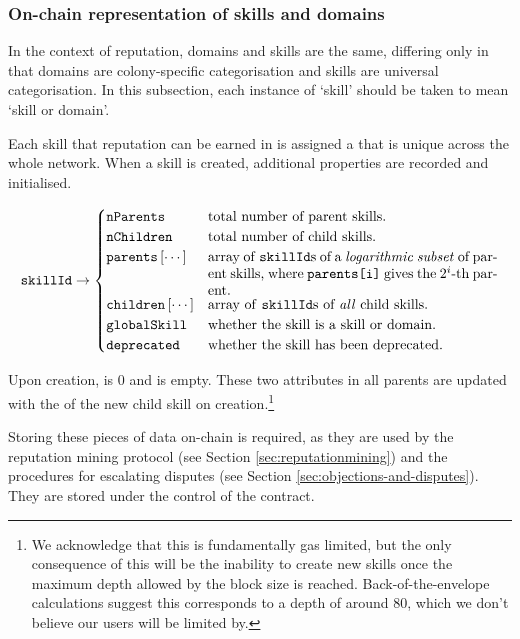 \subsubsection{On-chain representation of skills and domains}\label{subsec:on-chain-representation-of-skills}

In the context of reputation, domains and skills are the same, differing only in that domains are colony-specific categorisation and skills are universal categorisation. In this subsection, each instance of `skill' should be taken to mean `skill or domain'.

Each skill that reputation can be earned in is assigned a  that is unique across the whole network. When a skill is created, additional properties are recorded and initialised.

\begin{equation*}
  \ascode{skillId} \rightarrow
  \begin{cases}
    \ascode{nParents} &	\textnormal{total number of parent skills.}\\
    \ascode{nChildren} &	\textnormal{total number of child skills.}\\
    \ascode{parents}\left[\cdots\right] &	\parbox[t]{.6\linewidth}{\textnormal{array of \ascode{skillId}s of a \textit{logarithmic subset} of parent skills, where \ascode{parents[i]} gives the $2^i$-th parent.}}\\
    \ascode{children}\left[\cdots\right] &	\textnormal{array of \ascode{skillId}s of \textit{all} child skills.}\\
    \ascode{globalSkill} &	\textnormal{whether the skill is a skill or domain.}\\
    \ascode{deprecated} &	\textnormal{whether the skill has been deprecated.}
  \end{cases}
\end{equation*}

Upon creation,  is 0 and  is empty. These two attributes in all parents are updated with the  of the new child skill on creation.\footnote{We acknowledge that this is fundamentally gas limited, but the only consequence of this will be the inability to create new skills once the maximum depth allowed by the block size is reached. Back-of-the-envelope calculations suggest this corresponds to a depth of around 80, which we don't believe our users will be limited by.}

Storing these pieces of data on-chain is required, as they are used by the reputation mining protocol (see Section \ref{sec:reputationmining}) and the procedures for escalating disputes (see Section \ref{sec:objections-and-disputes}). They are stored under the control of the  contract.


